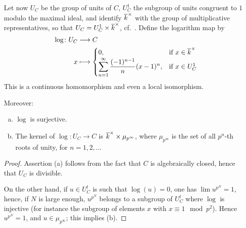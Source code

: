 \begin{subappendices}
Let now $U_C$ be the group of units of $C$, $U_C^1$ the subgroup of units
congruent to $1$ modulo the maximal ideal, and identify ${\overline{k}}^\times$
with the group of multiplicative representatives, so that $U_C = U_C^1 \times
{\overline{k}}^\times$, cf.\ \cite[44]{29}. Define the logarithm map by
\begin{align*}
	\log \colon U_C &\longrightarrow C \\
	x &\longmapsto
	\begin{cases}
		0, & \text{if } x \in {\overline{k}}^\times \\
		\displaystyle \sum_{n=1}^{\infty} \frac{(-1)^{n-1}}{n} (x-1)^n, & \text{if } x \in U_C^1
	\end{cases}
\end{align*}
This is a continuous homomorphism and even a local isomorphism.
\dpage

Moreover:
\begin{lem}
\begin{enumerate}[(a)]
\item $\log$ is surjective.
\item The kernel of $\log \colon U_C \to C$ is $\overline{k}^\times \times
	\mu_{p^\infty}$, where $\mu_{p^\infty}$ is the set of all $p^n$-th
	roots of unity, for $n = 1,2, \hdots$
\end{enumerate}
\end{lem}

\begin{proof}
Assertion (a) follows from the fact that $C$ is algebraically closed, hence that
$U_C$ is divisible.

On the other hand, if $u \in U^l_C$ is such that $\log(u) = 0$, one has $\lim
u^{p^N} = 1$, hence, if $N$ is large enough, $u^{p^N}$ belongs to a subgroup of
$U^l_C$ where $\log$ is injective (for instance the subgroup of elements $x$
with $x \equiv 1 \mod p^2$). Hence $u^{p^N} = 1$, and $u \in \mu_{p^\infty}$;
this implies (b).
\end{proof}


\end{subappendices}
